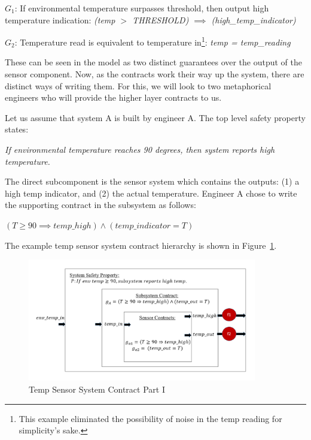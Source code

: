 $G_1$: If environmental temperature surpasses threshold, then output high temperature indication: \textit{(temp $>$ THRESHOLD) $\implies$ (high\_temp\_indicator)}

$G_2$: Temperature read is equivalent to temperature in\footnote{This example eliminated the possibility of noise in the temp reading for simplicity's sake.}: \textit{temp = temp\_reading} 


These can be seen in the model as two distinct guarantees over the output of the sensor component. Now, as the contracts work their way up the system, there are distinct ways of writing them. For this, we will look to two metaphorical engineers who will provide the higher layer contracts to us. 

Let us assume that system A is built by engineer A. The top level safety property states: 
\begin{center}
    \textit{If environmental temperature reaches 90 degrees, then system reports high temperature.}
\end{center}

The direct subcomponent is the sensor system which contains the outputs: (1) a high temp indicator, and (2) the actual temperature. Engineer A chose to write the supporting contract in the subsystem as follows: 
\begin{center}
    $(T \geq 90 \implies temp\_high) \land (temp\_indicator = T)$ 
\end{center}
  
The example temp sensor system contract hierarchy is shown in Figure~\ref{fig:granularityEx1}.  

\begin{figure}[h!]
\begin{center}
\includegraphics[width=10cm]{images/granularityEx.PNG}
\caption{Temp Sensor System Contract Part I} \label{fig:granularityEx1}
\end{center}
\end{figure}

